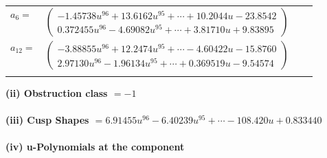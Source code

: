 \documentclass[1p]{elsarticle_modified}
\theoremstyle{definition}
\begin{document}
\begin{tabular}{m{7pt} m{180pt} m{7pt} m{180pt} }
\flushright $a_{6}=$&$\begin{pmatrix}-1.45738 u^{96}+13.6162 u^{95}+\cdots+10.2044 u-23.8542\\0.372455 u^{96}-4.69082 u^{95}+\cdots+3.81710 u+9.83895\end{pmatrix}$ \\
\flushright $a_{12}=$&$\begin{pmatrix}-3.88855 u^{96}+12.2474 u^{95}+\cdots-4.60422 u-15.8760\\2.97130 u^{96}-1.96134 u^{95}+\cdots+0.369519 u-9.54574\end{pmatrix}$\\&\end{tabular}
\flushleft \textbf{(ii) Obstruction class $= -1$}\\~\\
\flushleft \textbf{(iii) Cusp Shapes $= 6.91455 u^{96}-6.40239 u^{95}+\cdots-108.420 u+0.833440$}\\~\\
\newpage\renewcommand{\arraystretch}{1}
\flushleft \textbf{(iv) u-Polynomials at the component}\newline \\
\end{document}
